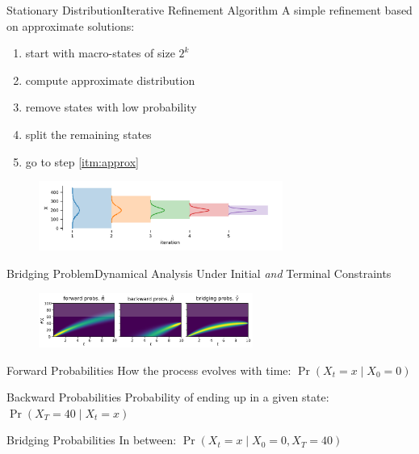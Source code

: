 \documentclass[10pt]{beamer}
\newcommand{\bottomcite}[1]{\vspace*{\fill} {\scriptsize \parencite{#1}}}
\begin{document}
\begin{frame}{Stationary Distribution}{Iterative Refinement Algorithm}
    A simple refinement based on approximate solutions:
    \begin{enumerate}
        \item start with macro-states of size $2^k$
        \item\label{itm:approx} compute approximate distribution
        \item remove states with low probability
        \item split the remaining states
        \item go to step \ref{itm:approx}
    \end{enumerate}
    \begin{figure}
        \includegraphics[width=8cm]{../gfx/bd_truncs.pdf}
    \end{figure}
    \bottomcite{backenkohler2020analysis,backenkohler2021abstraction}
\end{frame}

\begin{frame}{Bridging Problem}{Dynamical Analysis Under Initial \emph{and} Terminal Constraints}
    \begin{figure}
        \includegraphics[width=7cm]{../gfx/bridging_bd.pdf}
    \end{figure}
    \begin{block}{Forward Probabilities}
        How the process evolves with time: $\Pr({X_t=x\mid X_0=0})$
    \end{block}
    \begin{block}{Backward Probabilities}
        Probability of ending up in a given state: $\Pr(X_T=40 \mid X_t = x)$
    \end{block}
    \begin{block}{Bridging Probabilities}
        In between: $\Pr (X_t=x\mid X_0=0, X_T=40)$
    \end{block}
    \bottomcite{backenkohler2020analysis}
\end{frame}
\end{document}
